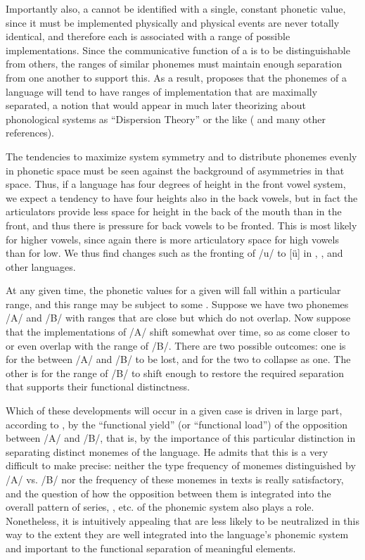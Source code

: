 Importantly also, a  cannot be identified with a single, constant
phonetic value, since it must be implemented physically and 
physical events are never totally identical, and therefore each  is
associated with a range of possible implementations. Since the
communicative function of a  is to be distinguishable from
others, the ranges of similar phonemes must maintain enough separation
from one another to support this. As a result, {\Martinet} proposes that
the phonemes of a language will tend to have ranges of implementation
that are maximally separated, a notion that would appear in much later
theorizing about phonological systems as ``Dispersion Theory'' or the
like (\citealt{liljencrants.lindblom72:dispersion} and many other
references).

The tendencies to maximize system symmetry and to distribute phonemes
evenly in phonetic space must be seen against the background of
asymmetries in that space. Thus, if a language has four degrees of
height in the front vowel system, we expect a tendency to have four
heights also in the back vowels, but in fact the articulators provide
less space for height  in the back of the mouth than in the
front, and thus there is pressure for back vowels to be fronted. This
is most likely for higher vowels, since again there is more
articulatory space for high vowels than for low. We thus find changes
such as the fronting of /u/ to {[ü]} in , , and other
languages.

At any given time, the phonetic values for a given  will fall
within a particular range, and this range may be subject to some
. Suppose we have two phonemes /A/ and /B/ with ranges that
are close but which do not overlap. Now suppose that the
implementations of /A/ shift somewhat over time, so as come closer to
or even overlap with the range of /B/. There are two possible
outcomes: one is for the  between /A/ and /B/ to be lost, and
for the two to collapse as one. The other is for the range of /B/ to
shift enough to restore the required separation that supports their
functional distinctness.

Which of these developments will occur in a given case is driven in
large part, according to {\Martinet}, by the ``functional yield'' (or
``functional load'') of the opposition between /A/ and /B/, that is,
by the importance of this particular distinction in separating
distinct monemes of the language. He admits that this is a very
difficult  to make precise: neither the type frequency of
monemes distinguished by /A/ vs. /B/ nor the  frequency of these
monemes in texts is really satisfactory, and the question of how the
opposition between them is integrated into the overall pattern of
series, , etc. of the phonemic system also plays a
role. Nonetheless, it is intuitively appealing that  are
less likely to be neutralized in this way to the extent they are
well integrated into the language's phonemic system and
important to the functional separation of meaningful elements.

